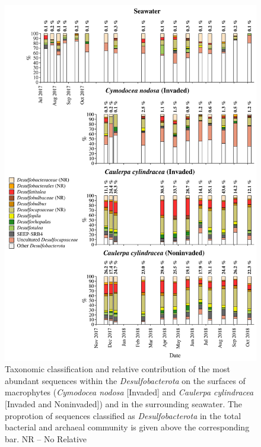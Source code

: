 \documentclass[12pt,]{article}
\begin{document}
\begin{figure}[H]

{\centering \includegraphics[width=0.85\linewidth]{../results/figures/desulfobacterota_bar_plot} 

}

\caption{Taxonomic classification and relative contribution of the most abundant sequences within the \textit{Desulfobacterota} on the surfaces of macrophytes (\textit{Cymodocea nodosa} [Invaded] and \textit{Caulerpa cylindracea} [Invaded and Noninvaded]) and in the surrounding seawater. The proprotion of sequences classified as \textit{Desulfobacterota} in the total bacterial and archaeal community is given above the corresponding bar. NR -- No Relative\label{desulfo}}\label{fig:unnamed-chunk-9}
\end{figure}
\end{document}
